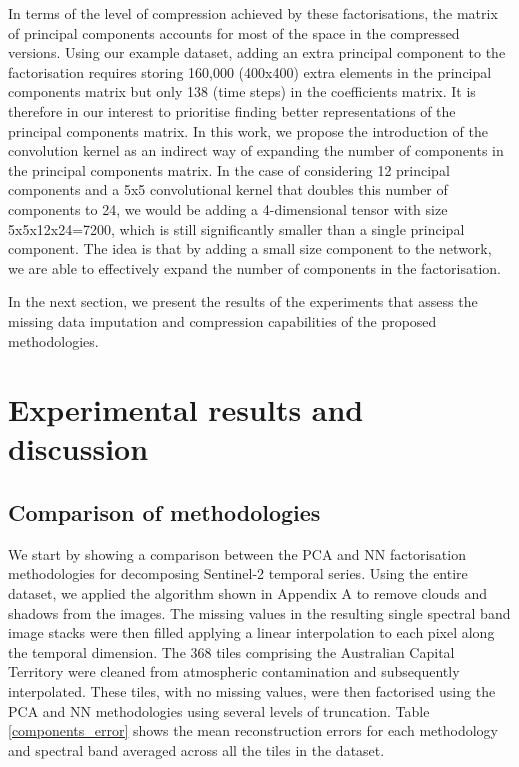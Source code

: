 \documentclass[essd, manuscript]{copernicus}
\begin{document}
In terms of the level of compression achieved by these factorisations, the matrix of principal components accounts for most of the space in the compressed versions. Using our example dataset, adding an extra principal component to the factorisation requires storing 160,000 (400x400) extra elements in the principal components matrix but only 138 (time steps) in the coefficients matrix. It is therefore in our interest to prioritise finding better representations of the principal components matrix. In this work, we propose the introduction of the convolution kernel as an indirect way of expanding the number of components in the principal components matrix. In the case of considering 12 principal components and a 5x5 convolutional kernel that doubles this number of components to 24, we would be adding a 4-dimensional tensor with size 5x5x12x24=7200, which is still significantly smaller than a single principal component. The idea is that by adding a small size component to the network, we are able to effectively expand the number of components in the factorisation.

In the next section, we present the results of the experiments that assess the missing data imputation and compression capabilities of the proposed methodologies. 


\section{Experimental results and discussion}

\subsection{Comparison of methodologies}
We start by showing a comparison between the PCA and NN factorisation methodologies for decomposing Sentinel-2 temporal series. Using the entire dataset, we applied the algorithm shown in Appendix A to remove clouds and shadows from the images. The missing values in the resulting single spectral band image stacks were then filled applying a linear interpolation to each pixel along the temporal dimension. The 368 tiles comprising the Australian Capital Territory were cleaned from atmospheric contamination and subsequently interpolated. These tiles, with no missing values, were then factorised using the PCA and NN methodologies using several levels of truncation. Table \ref{components_error} shows the mean reconstruction errors for each methodology and spectral band averaged across all the tiles in the dataset. 
\end{document}
